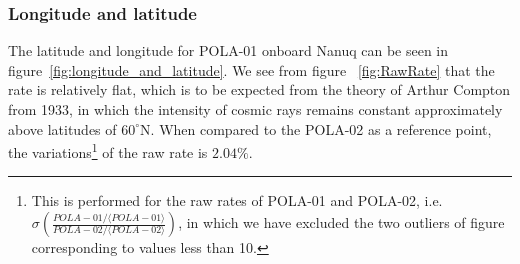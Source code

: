 \documentclass[12pt,a4paper]{amsart}
\begin{document}
\subsubsection{Longitude and latitude}
The latitude and longitude for POLA-01 onboard Nanuq can be seen in figure~\ref{fig:longitude_and_latitude}. We see from figure ~\ref{fig:RawRate} that the rate is relatively flat, which is to be expected from the theory of Arthur Compton from 1933, in which the intensity of cosmic rays remains constant approximately above latitudes of $60^\circ$N. When compared to the POLA-02 as a reference point, the variations\footnote{This is performed for the raw rates of POLA-01 and POLA-02, i.e. $\sigma\left(\frac{POLA-01/\langle POLA-01\rangle}{POLA-02/\langle POLA-02 \rangle}\right)$, in which we have excluded the two outliers of figure~ corresponding to values less than 10.} of the raw rate is $2.04\%$. 
\end{document}
